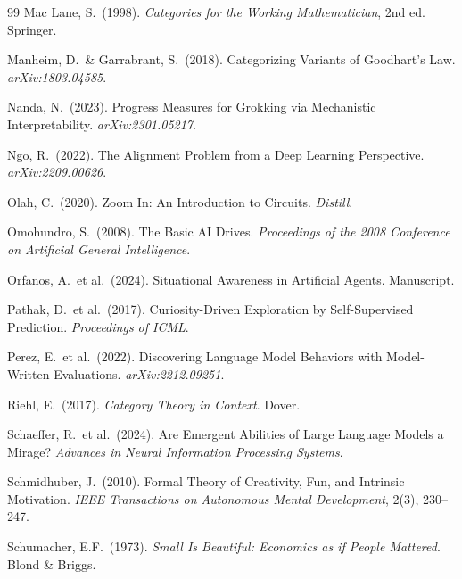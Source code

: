 \documentclass[12pt]{article}
\theoremstyle{definition}
\begin{document}
\begin{thebibliography}{99}
Mac Lane, S.\ (1998).
\newblock \emph{Categories for the Working Mathematician}, 2nd ed.
\newblock Springer.

Manheim, D.\ \& Garrabrant, S.\ (2018).
\newblock Categorizing Variants of Goodhart's Law.
\newblock \emph{arXiv:1803.04585}.

Nanda, N.\ (2023).
\newblock Progress Measures for Grokking via Mechanistic Interpretability.
\newblock \emph{arXiv:2301.05217}.

Ngo, R.\ (2022).
\newblock The Alignment Problem from a Deep Learning Perspective.
\newblock \emph{arXiv:2209.00626}.

Olah, C.\ (2020).
\newblock Zoom In: An Introduction to Circuits.
\newblock \emph{Distill}.

Omohundro, S.\ (2008).
\newblock The Basic AI Drives.
\newblock \emph{Proceedings of the 2008 Conference on Artificial General
Intelligence}.

Orfanos, A.\ et al.\ (2024).
\newblock Situational Awareness in Artificial Agents.
\newblock Manuscript.

Pathak, D.\ et al.\ (2017).
\newblock Curiosity-Driven Exploration by Self-Supervised Prediction.
\newblock \emph{Proceedings of ICML}.

Perez, E.\ et al.\ (2022).
\newblock Discovering Language Model Behaviors with Model-Written Evaluations.
\newblock \emph{arXiv:2212.09251}.

Riehl, E.\ (2017).
\newblock \emph{Category Theory in Context}.
\newblock Dover.

Schaeffer, R.\ et al.\ (2024).
\newblock Are Emergent Abilities of Large Language Models a Mirage?
\newblock \emph{Advances in Neural Information Processing Systems}.

Schmidhuber, J.\ (2010).
\newblock Formal Theory of Creativity, Fun, and Intrinsic Motivation.
\newblock \emph{IEEE Transactions on Autonomous Mental Development}, 2(3),
230--247.

Schumacher, E.F.\ (1973).
\newblock \emph{Small Is Beautiful: Economics as if People Mattered}.
\newblock Blond \& Briggs.


\end{thebibliography}
\end{document}
